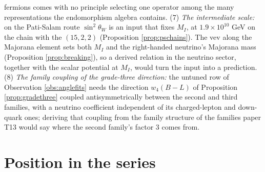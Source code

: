 \documentclass[11pt]{article}
\theoremstyle{definition}
\begin{document}
fermions comes with no principle selecting one operator among the many representations the endomorphism algebra contains. (7) \emph{The intermediate scale:} on the Pati-Salam route $\sin^{2}\theta_{W}$ is an input that fixes $M_{I}$, at $1.9 \times 10^{10}$ GeV on the chain with the $(15,2,2)$ (Proposition \ref{prop:pschains}). The vev along the Majorana element sets both $M_{I}$ and the right-handed neutrino's Majorana mass (Proposition \ref{prop:breaking}), so a derived relation in the neutrino sector, together with the scalar potential at $M_{I}$, would turn the input into a prediction. (8) \emph{The family coupling of the grade-three direction:} the untuned row of Observation \ref{obs:anglefits} needs the direction $w_{4}(B - L)$ of Proposition \ref{prop:gradethree} coupled antisymmetrically between the second and third families, with a neutrino coefficient independent of its charged-lepton and down-quark ones; deriving that coupling from the family structure of the families paper T13 \cite{ButlerT13} would say where the second family's factor $3$ comes from.


\section{Position in the series}\label{sec:position}
\end{document}
